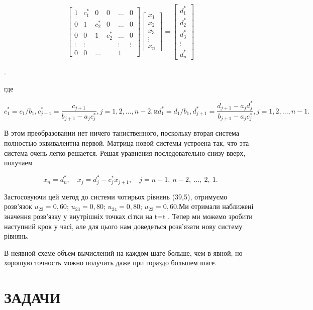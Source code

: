 \documentclass[
  ukrainian,
]{article}
\begin{document}
\[
\begin{bmatrix} 1 & c_1^* & 0 & 0 & \dots & 0 \\ 0 & 1 & c_2^* & 0 & \dots & 0 \\ 0 & 0 & 1 & c_2^* & \dots & 0 \\ \vdots & \vdots & & & \vdots & \vdots \\ 0 & 0 & \dots & & 1 \end{bmatrix}
\begin{bmatrix} x_1 \\ x_2 \\ x_3 \\ \vdots \\ x_n \end{bmatrix}
=
\begin{bmatrix} d_1^* \\ d_2^* \\ d_3^* \\ \vdots \\ d_n^* \end{bmatrix}
\]

.

где

\[
c_1^* = c_1/b_1
,  c_{j+1}^* = \frac{c_{j+1}}{b_{j+1} - a_j c_j^*}  ,  j = 1, 2, \ldots, n-2  , и  d_1^* = d_1/b_1  ,  d_{j+1}^* = \frac{d_{j+1} - a_j d_j^*}{b_{j+1} - a_j c_j^*}  ,  j = 1,  2, \ldots, n-1  .
\]

В этом преобразовании нет ничего таниственного, поскольку вторая система
полностью эквивалентна первой. Матрица новой системы устроена так, что
эта система очень легко решается. Решая уравнения последовательно снизу
вверх, получаем

\[
x_n = d_n^*, \quad x_j = d_j^* - c_j^* x_{j+1}, \quad j = n-1, \ n-2, \ \dots, \ 2, \ 1.
\]

Застосовуючи цей метод до системи чотирьох рівнянь (39,5), отримуємо
розв'язок \(u_{22}=0,60\); \(u_{23}=0,80\); \(u_{24}=0,80\);
\(u_{23}=0,60\).Ми отримали наближені значення розв'язку у внутрішніх
точках сітки на t=\Delta t . Тепер ми можемо зробити наступний крок у
часі, але для цього нам доведеться розв'язати нову систему рівнянь.

В неявной схеме объем вычислений на каждом шаге больше, чем в явной, но
хорошую точность можно получить даже при гораздо большем шаге.

\section{ЗАДАЧИ}\label{ux437ux430ux434ux430ux447ux438-17}
\end{document}
